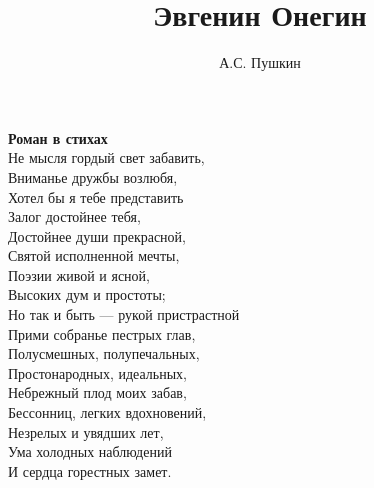 \documentclass[10pt,a4paper]{book}
\title{Эвгенин Онегин}
\author{А.С. Пушкин}
\begin{document}
\maketitle
\textbf{Роман в стихах}\\
Не мысля гордый свет забавить,\\
Вниманье дружбы возлюбя,\\
Хотел бы я тебе представить\\
Залог достойнее тебя,\\
Достойнее души прекрасной,\\
Святой исполненной мечты,\\
Поэзии живой и ясной,\\
Высоких дум и простоты;\\
Но так и быть — рукой пристрастной\\
Прими собранье пестрых глав,\\
Полусмешных, полупечальных,\\
Простонародных, идеальных,\\
Небрежный плод моих забав,\\
Бессонниц, легких вдохновений,\\
Незрелых и увядших лет,\\
Ума холодных наблюдений\\
И сердца горестных замет.
\end{document}

